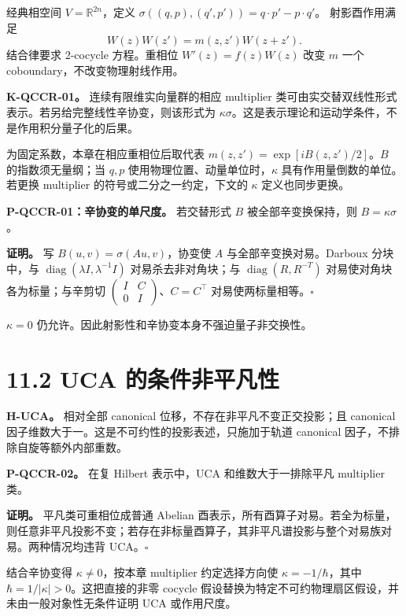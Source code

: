\documentclass[
  11pt,
  oneside]{book}
\begin{document}
经典相空间 \(V=\mathbb R^{2n}\)，定义
\(\sigma((q,p),(q',p'))=q\cdot p'-p\cdot q'\)。 射影酉作用满足 \[
W(z)W(z')=m(z,z')W(z+z').
\] 结合律要求 2-cocycle 方程。重相位 \(W'(z)=f(z)W(z)\) 改变 \(m\) 一个
coboundary，不改变物理射线作用。

\textbf{K-QCCR-01。} 连续有限维实向量群的相应 multiplier
类可由实交替双线性形式表示。若另给完整线性辛协变，则该形式为
\(\kappa\sigma\)。这是表示理论和运动学条件，不是作用积分量子化的后果。

为固定系数，本章在相应重相位后取代表 \(m(z,z')=\exp[iB(z,z')/2]\)。\(B\)
的指数须无量纲；当 \(q,p\) 使用物理位置、动量单位时，\(\kappa\)
具有作用量倒数的单位。若更换 multiplier 的符号或二分之一约定，下文的
\(\kappa\) 定义也同步更换。

\protect\hypertarget{p-qccr-01}{}{}

\textbf{P-QCCR-01：辛协变的单尺度。} 若交替形式 \(B\)
被全部辛变换保持，则 \(B=\kappa\sigma\)。

\textbf{证明。} 写 \(B(u,v)=\sigma(Au,v)\)，协变使 \(A\)
与全部辛变换对易。Darboux 分块中，与
\(\operatorname{diag}(\lambda I,\lambda^{-1}I)\) 对易杀去非对角块；与
\(\operatorname{diag}(R,R^{-T})\) 对易使对角块各为标量；与辛剪切
\(\left(\begin{smallmatrix}I&C\\0&I\end{smallmatrix}\right)\)、\(C=C^\top\)
对易使两标量相等。\(\square\)

\(\kappa=0\) 仍允许。因此射影性和辛协变本身不强迫量子非交换性。

\section{11.2 UCA 的条件非平凡性}

\textbf{H-UCA。} 相对全部 canonical 位移，不存在非平凡不变正交投影；且
canonical 因子维数大于一。这是不可约性的投影表述，只施加于轨道 canonical
因子，不排除自旋等额外内部重数。

\protect\hypertarget{p-qccr-02}{}{}

\textbf{P-QCCR-02。} 在复 Hilbert 表示中，UCA 和维数大于一排除平凡
multiplier 类。

\textbf{证明。} 平凡类可重相位成普通 Abelian
酉表示，所有酉算子对易。若全为标量，则任意非平凡投影不变；若存在非标量酉算子，其非平凡谱投影与整个对易族对易。两种情况均违背
UCA。\(\square\)

结合辛协变得 \(\kappa\ne0\)，按本章 multiplier 约定选择方向使
\(\kappa=-1/\hbar\)，其中 \(\hbar=1/|\kappa|>0\)。这把直接的非零 cocycle
假设替换为特定不可约物理扇区假设，并未由一般对象性无条件证明 UCA
或作用尺度。
\end{document}
